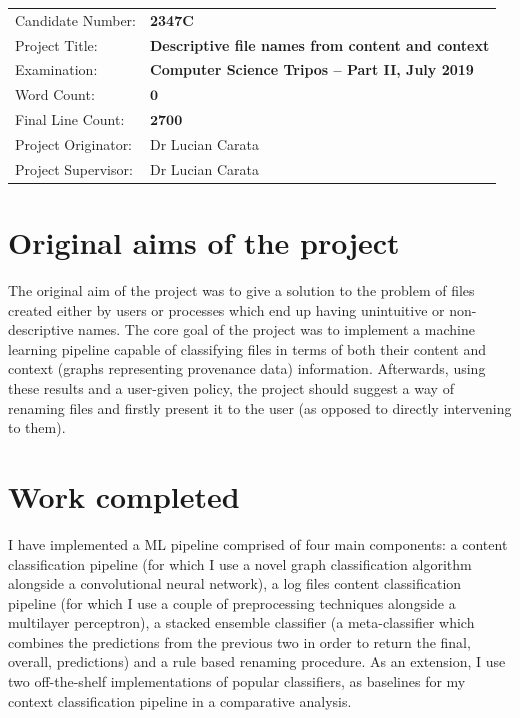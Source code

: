 \documentclass[12pt,a4paper,oneside]{report}
\begin{document}
{\large
  \begin{tabular}{ll}
    Candidate Number:   & \bf 2347C                          \\
    Project Title:      & \bf Descriptive file names from content and context \\
    Examination:        & \bf Computer Science Tripos -- Part II, July 2019   \\
    Word Count:         & \bf $\mathbf{0}$\footnotemark[1]                    \\
    Final Line Count:   & \bf $\mathbf{2700}$\footnotemark[2]                    \\
    Project Originator: & Dr Lucian Carata                                    \\
    Project Supervisor: & Dr Lucian Carata                                    \\
  \end{tabular}
}




\section*{Original aims of the project}

The original aim of the project was to give a solution to the problem of files created either by users or processes which end up having unintuitive or non-descriptive names. The core goal of the project was to implement a machine learning pipeline capable of classifying files in terms of both their content and context (graphs representing provenance data) information. Afterwards, using these results and a user-given policy, the project should suggest a way of renaming files and firstly present it to the user (as opposed to directly intervening to them).

\section*{Work completed}
I have implemented a ML pipeline comprised of four main components: a content classification pipeline (for which I use a novel graph classification algorithm alongside a convolutional neural network), a log files content classification pipeline (for which I use a couple of preprocessing techniques alongside a multilayer perceptron), a stacked ensemble classifier (a meta-classifier which combines the predictions from the previous two in order to return the final, overall, predictions) and a rule based renaming procedure. As an extension, I use two off-the-shelf implementations of popular classifiers, as baselines for my context classification pipeline in a comparative analysis. 
\end{document}
